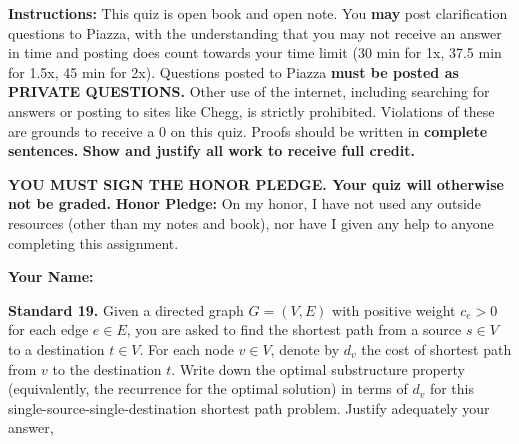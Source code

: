\documentclass[11pt]{article}
\begin{document}
\renewcommand{\headrulewidth}{0.5pt}

\phantom{Test}

\begin{small}
\noindent \textbf{Instructions:} This quiz is open book and open note. You \textbf{may} post clarification questions to Piazza, with the understanding that you may not receive an answer in time and posting does count towards your time limit (30 min for 1x, 37.5 min for 1.5x, 45 min for 2x). Questions posted to Piazza \textbf{must be posted as PRIVATE QUESTIONS.} Other use of the internet, including searching for answers or posting to sites like Chegg, is strictly prohibited. Violations of these are grounds to receive a 0 on this quiz. Proofs should be written in \textbf{complete sentences.} \textbf{Show and justify all work to receive full credit.} 

\noindent \textbf{YOU MUST SIGN THE HONOR PLEDGE. Your quiz will otherwise not be graded.}  
\noindent \textbf{Honor Pledge:} On my honor, I have not used any outside resources (other than my notes and book), nor have I given any help to anyone completing this assignment. 

\noindent \textbf{Your Name:} \underline{\hskip 250pt}
\end{small} 

\hrulefill 


\noindent \textbf{Standard 19.} Given a directed graph $G = (V, E)$ with positive weight $c_e>0$ for each edge $e\in E$, you are asked to find the shortest path from a source $s\in V$ to a destination $t\in V$. For each node $v\in V$, denote by $d_v$ the cost of shortest path from $v$ to the destination $t$. Write down the optimal substructure property (equivalently, the recurrence for the optimal solution) in terms of $d_v$ for this single-source-single-destination shortest path problem. Justify adequately your answer, 




\end{document}
